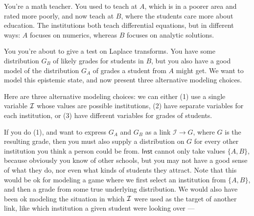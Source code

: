 \documentclass{article}
\begin{document}
	\begin{example} \label{ex:teacher}
		You're a math teacher. You used to teach at $A$, which is in a poorer area and rated more poorly, and now teach at $B$, where the students care more about education. The institutions both teach differential equations, but in different ways: $A$ focuses on numerics, whereas $B$ focuses on analytic solutions.
		
		You you're about to give a test on Laplace transforms.
		You have some distribution $G_B$ of likely grades for students in $B$, but you also have a good model of the distribution $G_A$ of grades a student from $A$ might get. We want to model this epistemic state, and now present three alternative modeling choices.

		Here are three alternative modeling choices: we can either (1) use a single variable $\cal I$ whose values are possible institutions, (2) have separate variables for each institution, or (3) have different variables for grades of students.
		
		\begin{center}
		\end{center}
		
		If you do (1), and want to express $G_A$ and $G_B$ as a link $\mathcal  I \to G$, where $G$ is the resulting grade, then you must also supply a distribution on $G$ for every other institution you think a person could be from. $\mathsf {Inst}$ cannot only take values $\{A,B\} $, because obviously you know of other schools, but you may not have a good sense of what they do, nor even what kinds of students they attract. 
			Note that this would be ok for modeling a game where we first select an institution from $\{A, B\}$, and then a grade from some true underlying distribution. We would also have been ok modeling the situation in which $\cal I$ were used as the target of another link, like which institution a given student were looking over --- 
		

\end{example}
\end{document}
